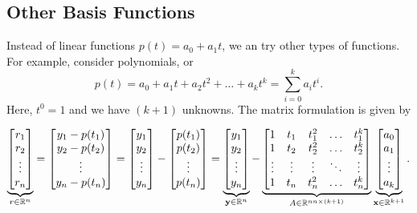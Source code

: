 \documentclass[letterpaper]{article}
\newcommand{\0}{\mathbf{0}}
\newcommand{\y}{\mathbf{y}}
\newcommand{\x}{\mathbf{x}}
\begin{document}
\subsection{Other Basis Functions}
Instead of linear functions $p(t) = a_0 + a_1 t$, we an try other types of functions. For example, consider polynomials, or \[p(t) = a_0 + a_1 t + a_2 t^2 + \hdots + a_k t^k = \sum_{i = 0}^{k} a_i t^i.\] Here, $t^0 = 1$ and we have $(k + 1)$ unknowns. The matrix formulation is given by

\[\underbrace{\begin{bmatrix}
    r_1 \\ r_2 \\ \vdots \\ r_n
\end{bmatrix}}_{r \in \R^n} = \begin{bmatrix}
    y_1 - p(t_1) \\ 
    y_2 - p(t_2) \\ 
    \vdots \\ 
    y_n - p(t_n)
\end{bmatrix} = \begin{bmatrix}
    y_1 \\ y_2 \\ \vdots \\ y_n
\end{bmatrix} - \begin{bmatrix}
    p(t_1) \\ p(t_2) \\ \vdots \\ p(t_n)
\end{bmatrix} = \underbrace{\begin{bmatrix}
    y_1 \\ y_2 \\ \vdots \\ y_n
\end{bmatrix}}_{\y \in \R^n} - \underbrace{\begin{bmatrix}
    1 & t_1 & t_1^2 & \hdots & t_1^k \\ 
    1 & t_2 & t_2^2 & \hdots & t_2^k \\ 
    \vdots & \vdots & \vdots & \ddots & \vdots \\ 
    1 & t_n & t_n^2 & \hdots & t_n^k
\end{bmatrix}}_{A \in \R^{nn \times (k + 1)}} \underbrace{\begin{bmatrix}
    a_0 \\ a_1 \\ \vdots \\ a_k
\end{bmatrix}}_{\x \in \R^{k + 1}}.\]
\end{document}
